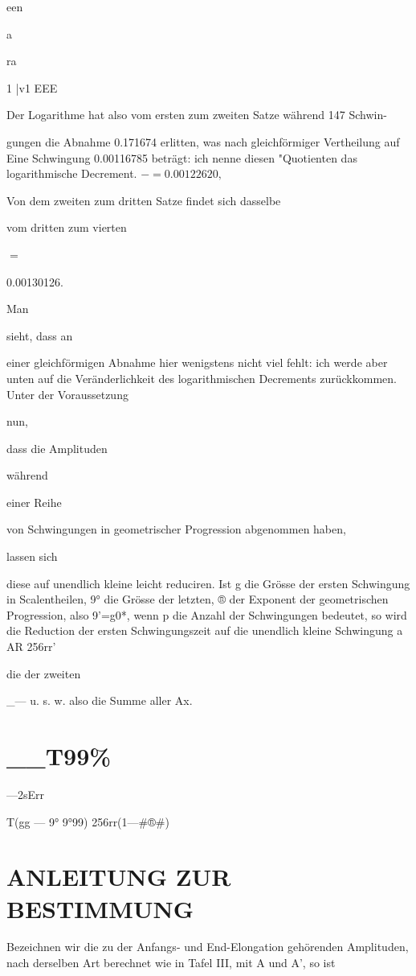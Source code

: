 \documentclass[12pt,a4paper]{article}
\begin{document}
een

a

ra

1 |v1 EEE

Der Logarithme hat also vom ersten zum zweiten Satze während 147 Schwin-

gungen die Abnahme 0.171674 erlitten, was nach gleichförmiger Vertheilung auf Eine Schwingung 0.00116785 beträgt: ich nenne diesen "Quotienten das logarithmische Decrement. $-= 0.00122620,$

Von dem zweiten zum dritten Satze findet sich dasselbe

vom dritten zum vierten

$=$

0.00130126.

Man

sieht, dass an

einer gleichförmigen Abnahme hier wenigstens nicht viel fehlt: ich werde aber unten auf die Veränderlichkeit des logarithmischen Decrements zurückkommen. Unter der Voraussetzung

nun,

dass die Amplituden

während

einer Reihe

von Schwingungen in geometrischer Progression abgenommen haben,

lassen sich

diese auf unendlich kleine leicht reduciren. Ist g die Grösse der ersten Schwingung in Scalentheilen, 9° die Grösse der letzten, ® der Exponent der geometrischen Progression, also 9’=g0*, wenn p die Anzahl der Schwingungen bedeutet, so wird die Reduction der ersten Schwingungszeit auf die unendlich kleine Schwingung a AR 256rr’

die der zweiten

\_— u. s. w. also die Summe aller Ax.

\section*{\_\_T99\%}
—2sErr

T(gg — 9° 9°99) 256rr(1—\#®\#)

\section*{ANLEITUNG ZUR BESTIMMUNG}
Bezeichnen wir die zu der Anfangs- und End-Elongation gehörenden Amplituden, nach derselben Art berechnet wie in Tafel III, mit A und A’, so ist
\end{document}
